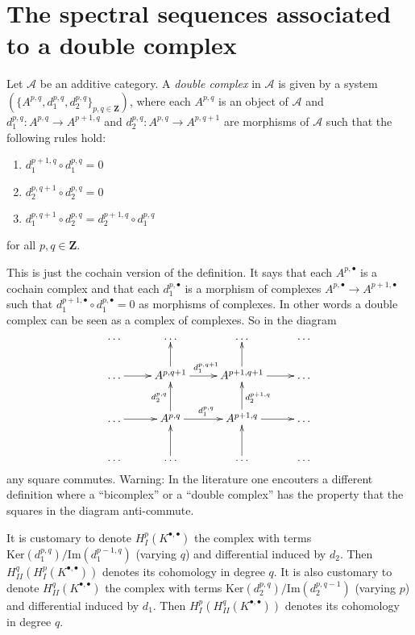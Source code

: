 \section{The spectral sequences associated to a double complex}
\label{section-double-complex}

\begin{definition}
\label{definition-double-complex}
Let $\mathcal{A}$ be an additive category.
A {\it double complex} in $\mathcal{A}$ is given
by a system $(\{A^{p, q}, d_1^{p, q}, d_2^{p, q}\}_{p, q\in \mathbf{Z}})$,
where each $A^{p, q}$ is an object of $\mathcal{A}$ and
$d_1^{p, q} : A^{p, q} \to A^{p + 1, q}$ and
$d_2^{p, q} : A^{p, q} \to A^{p, q + 1}$ are morphisms of $\mathcal{A}$
such that the following rules hold:
\begin{enumerate}
\item $d_1^{p + 1, q} \circ d_1^{p, q} = 0$
\item $d_2^{p, q + 1} \circ d_2^{p, q} = 0$
\item $d_1^{p, q + 1} \circ d_2^{p, q} = d_2^{p + 1, q} \circ d_1^{p, q}$
\end{enumerate}
for all $p, q \in \mathbf{Z}$.
\end{definition}

\noindent
This is just the cochain version of the definition.
It says that each $A^{p, \bullet}$ is a cochain complex
and that each $d_1^{p, \bullet}$ is a morphism of complexes
$A^{p, \bullet} \to A^{p + 1, \bullet}$ such that
$d_1^{p + 1, \bullet} \circ d_1^{p, \bullet} = 0$ as morphisms
of complexes. In other words a double complex can be seen as
a complex of complexes. So in the diagram
$$
\xymatrix{
\ldots &
\ldots &
\ldots &
\ldots \\
\ldots \ar[r] &
A^{p, q + 1} \ar[r]^{d_1^{p, q + 1}} \ar[u] &
A^{p + 1, q + 1} \ar[r] \ar[u] &
\ldots \\
\ldots \ar[r] &
A^{p, q} \ar[r]^{d_1^{p, q}} \ar[u]^{d_2^{p, q}} &
A^{p + 1, q} \ar[r] \ar[u]_{d_2^{p + 1, q}} &
\ldots \\
\ldots &
\ldots \ar[u] &
\ldots \ar[u] &
\ldots
}
$$
any square commutes.
Warning: In the literature one encouters a different definition
where a ``bicomplex'' or  a ``double complex'' has the property that
the squares in the diagram anti-commute.

\medskip\noindent
It is customary to denote $H^p_{I}(K^{\bullet, \bullet})$
the complex with terms $\text{Ker}(d_1^{p, q})/\text{Im}(d_1^{p - 1, q})$
(varying $q$) and differential induced by $d_2$.
Then $H^q_{II}(H^p_{I}(K^{\bullet, \bullet}))$ denotes its cohomology in
degree $q$. It is also customary to denote $H^q_{II}(K^{\bullet, \bullet})$
the complex with terms $\text{Ker}(d_2^{p, q})/\text{Im}(d_2^{p, q - 1})$
(varying $p$) and differential induced by $d_1$.
Then $H^p_{I}(H^q_{II}(K^{\bullet, \bullet}))$ denotes its cohomology in
degree $q$.

